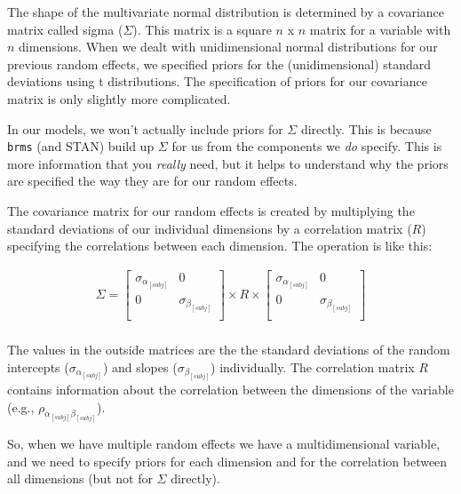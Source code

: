 \documentclass[
]{book}
\begin{document}
The shape of the multivariate normal distribution is determined by a covariance matrix called sigma (\(\Sigma\)). This matrix is a square \(n\) x \(n\) matrix for a variable with \(n\) dimensions. When we dealt with unidimensional normal distributions for our previous random effects, we specified priors for the (unidimensional) standard deviations using t distributions. The specification of priors for our covariance matrix is only slightly more complicated.

In our models, we won't actually include priors for \(\Sigma\) directly. This is because \texttt{brms} (and STAN) build up \(\Sigma\) for us from the components we \emph{do} specify. This is more information that you \emph{really} need, but it helps to understand why the priors are specified the way they are for our random effects.

The covariance matrix for our random effects is created by multiplying the standard deviations of our individual dimensions by a correlation matrix (\(R\)) specifying the correlations between each dimension. The operation is like this:

\begin{equation}
\begin{split}
\Sigma = \begin{bmatrix} \sigma_{\alpha_{[subj]}} & 0 \\ 0 & \sigma_{\beta_{[subj]}} \\ \end{bmatrix} 
\times R \times
\begin{bmatrix} \sigma_{\alpha_{[subj]}} & 0 \\ 0 & \sigma_{\beta_{[subj]}} \\ \end{bmatrix} \\
\end{split}
\label{eq:66}
\end{equation}

The values in the outside matrices are the the standard deviations of the random intercepts (\(\sigma_{\alpha_{[subj]}}\)) and slopes (\(\sigma_{\beta_{[subj]}}\)) individually. The correlation matrix \(R\) contains information about the correlation between the dimensions of the variable (e.g., \(\rho_{\alpha_{[subj]} \beta _{[subj]}}\)).

So, when we have multiple random effects we have a multidimensional variable, and we need to specify priors for each dimension and for the correlation between all dimensions (but not for \(\Sigma\) directly).
\end{document}
